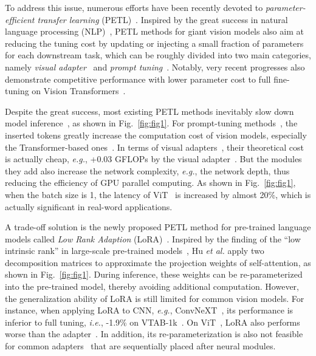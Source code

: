 To address this issue, numerous efforts have been recently devoted to \textit{ parameter-efficient transfer learning} (PETL)~\cite{adapter,prefix,ppt,ppp,autoprompt,zhong2021factual,vpt,lora,adaptformer,noah,cocoop,coop,vladapter}.   Inspired by the great success in natural language processing (NLP)~\cite{adapter,prefix,ppt,ppp,autoprompt,zhong2021factual,lora}, PETL methods for giant vision models also aim at reducing the tuning cost by updating or injecting a small fraction of parameters for each downstream task, which can be roughly divided into two main categories, namely \textit{visual adapter}~\cite{adaptformer,adapter,vladapter,noah,convbypass} and   \textit{prompt tuning}~\cite{vpt,noah,cocoop,coop}. Notably, very recent progresses   also demonstrate   competitive performance  with   lower parameter cost  to full fine-tuning on Vision Transformers~\cite{adaptformer,vpt,noah,cocoop,coop}.

Despite   the great success,    most  existing PETL methods  inevitably slow down model inference~\cite{lora}, as shown in Fig.~\ref{fig:fig1}.  For prompt-tuning methods~\cite{vpt,coop}, the inserted tokens greatly increase the computation cost of vision models, especially   the Transformer-based ones~\cite{vit,transformer}. In terms of visual adapters~\cite{adapter,adaptformer}, their theoretical cost is actually cheap, \emph{e.g.}, +0.03 GFLOPs by the visual adapter~\cite{adapter}.  But the modules they add also increase the network complexity, \emph{e.g.},  the network depth, thus reducing the efficiency of GPU parallel computing.  As shown in Fig.~\ref{fig:fig1}, when the batch size is  1, the latency of ViT~\cite{vit} is increased by  almost 20\%, which is actually significant in real-word applications.

 A  trade-off  solution   is  the newly proposed PETL method for pre-trained language models called  \emph{Low Rank Adaption} (LoRA)~\cite{lora}. Inspired by the finding  of the ``low intrinsic rank''  in large-scale pre-trained models~\cite{intrinsic}, Hu \emph{et al.} apply two decomposition matrices to approximate the projection weights of self-attention, as shown in Fig.~\ref{fig:fig1}. During inference, these weights can be re-parameterized  into the pre-trained model, thereby   avoiding additional  computation. However, the generalization ability of LoRA is still   limited  for common vision models. For instance, when applying LoRA to CNN, \emph{e.g.}, ConvNeXT~\cite{convnext},  its performance is   inferior to full tuning, \emph{i.e.}, -1.9\% on VTAB-1k~\cite{vtab}.  On ViT~\cite{vit}, LoRA  also performs worse than the adapter~\cite{adaptformer}. In addition, its re-parameterization   is also not feasible for common adapters~\cite{adapter,noah} that  are sequentially  placed after neural modules. 

